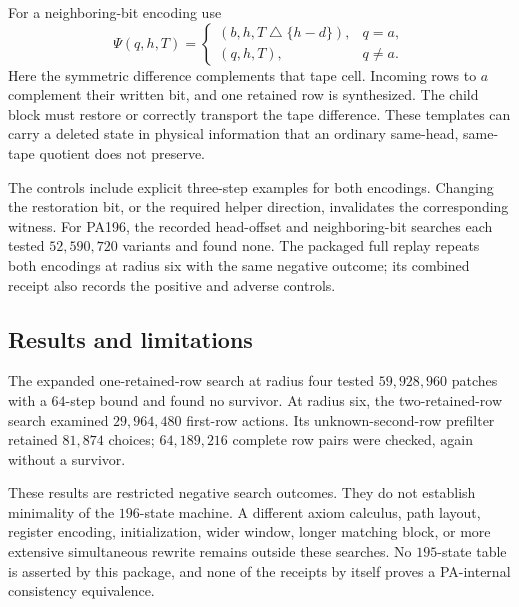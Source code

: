 For a neighboring-bit encoding use
\[
 \Psi(q,h,T)=
 \begin{cases}
 (b,h,T\mathbin{\triangle}\{h-d\}),&q=a,\\
 (q,h,T),&q\ne a.
 \end{cases}
\]
Here the symmetric difference complements that tape cell. Incoming rows to
$a$ complement their written bit, and one retained row is synthesized.
The child block must restore or correctly transport the tape difference.
These templates can carry a deleted state in physical information that an
ordinary same-head, same-tape quotient does not preserve.

The controls include explicit three-step examples for both encodings.
Changing the restoration bit, or the required helper direction, invalidates
the corresponding witness. For PA196, the recorded head-offset and
neighboring-bit searches each tested $52,590,720$ variants and found none.
The packaged full replay repeats both encodings at radius six with the same negative outcome; its combined receipt also records the positive and adverse controls.

\subsection{Results and limitations}

The expanded one-retained-row search at radius four tested $59,928,960$
patches with a $64$-step bound and found no survivor. At radius six, the
two-retained-row search examined $29,964,480$ first-row actions. Its
unknown-second-row prefilter retained $81,874$ choices; $64,189,216$
complete row pairs were checked, again without a survivor.

These results are restricted negative search outcomes. They do not establish
minimality of the $196$-state machine. A different axiom calculus, path layout,
register encoding, initialization, wider window, longer matching block, or
more extensive simultaneous rewrite remains outside these searches. No
$195$-state table is asserted by this package, and none of the receipts by
itself proves a PA-internal consistency equivalence.
